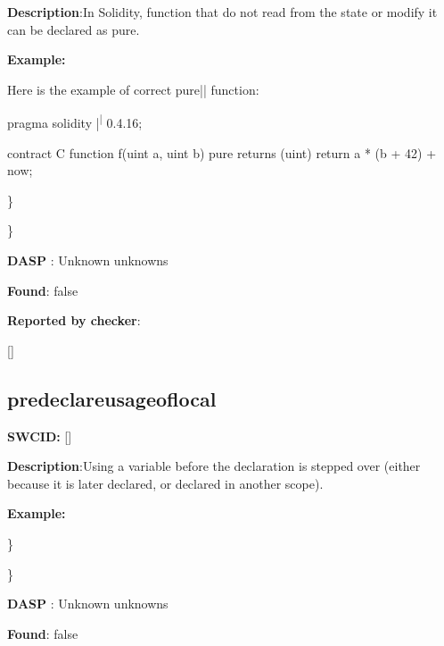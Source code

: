 \documentclass{article}
\begin{document}
\textbf{Description}:In Solidity, function that do not read from the state or modify it can be declared as pure.


\textbf{Example:} 
\begin{ffcode} 

Here is the example of correct pure|\textendash| function:

pragma solidity |\textsuperscript| 0.4.16;

contract C {
    function f(uint a, uint b) pure returns (uint) {
        return a * (b + 42) + now;
    }
}

\end{ffcode} 
\} 

\} 

\textbf{DASP} : Unknown unknowns

\textbf{Found}: false

\textbf{Reported by checker}: 
\begin{ffcode} 

[]
\end{ffcode} 
\subsection{pre{\textunderscore}declare{\textunderscore}usage{\textunderscore}of{\textunderscore}local} 
\textbf{SWC{\textunderscore}ID:} []

\textbf{Description}:Using a variable before the declaration is stepped over (either because it is later declared, or declared in another scope).


\textbf{Example:} 
\} 

\} 

\textbf{DASP} : Unknown unknowns

\textbf{Found}: false
\end{document}
